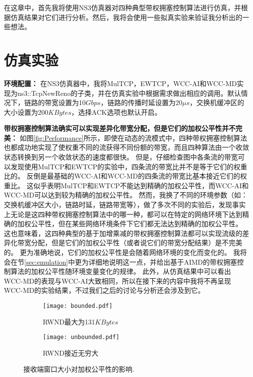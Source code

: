 \documentclass[winfonts]{njuthesis}
\begin{document}
在这章中，首先我将使用NS3仿真器\cite{NS3}对四种典型带权拥塞控制算法进行仿真，并根据仿真结果对它们进行分析。然后，我将会使用一些拟真实验来验证我分析出的一些想法。

\section{仿真实验}
\label{sec:simulation}

\textbf{环境配置：}
在NS3仿真器中，我将MulTCP，EWTCP，WCC-AI和WCC-MD实现为ns3::TcpNewReno的子类，并在仿真实验中根据需求做出相应的调用。默认情况下，链路的带宽设置为10$Gbps$，链路的传播时延设置为20$\mu s$，交换机缓冲区的大小设置为200$KBytes$，选择ACK选项也默认开启。

\textbf{带权拥塞控制算法确实可以实现差异化带宽分配，但是它们的加权公平性并不完美：}
如图\ref{fig:Performance}所示，即使在动态的流模式中，四种带权拥塞控制算法也都成功地实现了使权重不同的流获得不同份额的带宽，而且四种算法由一个收敛状态转换到另一个收敛状态的速度都很快。
但是，仔细检查图中各条流的带宽可以发现使用MulTCP和EWTCP的实验中，四条流的带宽比并不是等于它们的权重比的。
反倒是最基础的WCC-AI和WCC-MD的四条流的带宽比基本接近它们的权重比。
这似乎表明MulTCP和EWTCP不能达到精确的加权公平性，而WCC-AI和WCC-MD可以达到较为精确的加权公平性。
然而，我换了不同的环境参数（如：交换机缓冲区大小，链路时延，链路带宽等），做了多次不同的实验后，发现事实上无论是这四种带权拥塞控制算法中的哪一种，都可以在特定的网络环境下达到精确的加权公平性，但在某些网络环境条件下它们都无法达到精确的加权公平性。
这也意味着，这四种典型的基于加增乘减的带权拥塞控制算法都可以实现流级的差异化带宽分配，但是它们的加权公平性（或者说它们的带宽分配结果）是不完美的。
更为准确地说，它们的加权公平性是会随着网络环境的变化而变化的。
我将会在节\ref{sec:emulation}中更为详细地说明这一点，并给出基于AIMD的带权拥塞控制算法的加权公平性随环境变量变化的规律。
此外，从仿真结果中可以看出WCC-MD的表现与WCC-AI大致相同，所以在接下来的内容中我将不再呈现WCC-MD的实验结果，不过我们之后的讨论与分析还会涉及到它。

\begin{figure}[ht]
	\begin{subfigure}{.5\textwidth}
    \centering
    \texttt{[image: bounded.pdf]}
    \caption{RWND最大为131$KBytes$}
		\label{fig:BoundedCwnd}
  \end{subfigure}
	\begin{subfigure}{.5\textwidth}
		\centering
    \texttt{[image: unbounded.pdf]}
    \caption{RWND接近无穷大}
		\label{fig:UnbounedCwnd}
  \end{subfigure}
	\caption{接收端窗口大小对加权公平性的影响.}
	\label{fig:EndHostBuffer}
\end{figure}
\end{document}
